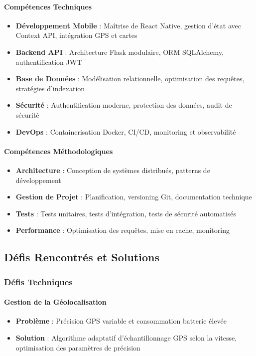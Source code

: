 \paragraph{Compétences Techniques}
\begin{itemize}
    \item \textbf{Développement Mobile} : Maîtrise de React Native, gestion d'état avec Context API, intégration GPS et cartes
    \item \textbf{Backend API} : Architecture Flask modulaire, ORM SQLAlchemy, authentification JWT
    \item \textbf{Base de Données} : Modélisation relationnelle, optimisation des requêtes, stratégies d'indexation
    \item \textbf{Sécurité} : Authentification moderne, protection des données, audit de sécurité
    \item \textbf{DevOps} : Containerisation Docker, CI/CD, monitoring et observabilité
\end{itemize}

\paragraph{Compétences Méthodologiques}
\begin{itemize}
    \item \textbf{Architecture} : Conception de systèmes distribués, patterns de développement
    \item \textbf{Gestion de Projet} : Planification, versioning Git, documentation technique
    \item \textbf{Tests} : Tests unitaires, tests d'intégration, tests de sécurité automatisés
    \item \textbf{Performance} : Optimisation des requêtes, mise en cache, monitoring
\end{itemize}

\subsection{Défis Rencontrés et Solutions}

\subsubsection{Défis Techniques}

\paragraph{Gestion de la Géolocalisation}
\begin{itemize}
    \item \textbf{Problème} : Précision GPS variable et consommation batterie élevée
    \item \textbf{Solution} : Algorithme adaptatif d'échantillonnage GPS selon la vitesse, optimisation des paramètres de précision
\end{itemize}

